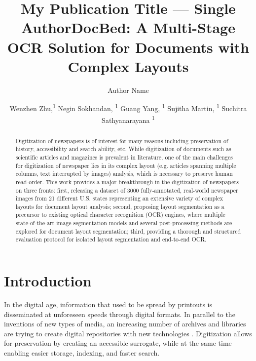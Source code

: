 \documentclass[letterpaper]{article} %
\title{My Publication Title --- Single Author}
\author {
    Author Name
}
\title{\title{DocBed: A Multi-Stage OCR Solution for Documents with Complex Layouts}}
\author {
    Wenzhen Zhu,\textsuperscript{\rm 1}
    Negin Sokhandan, \textsuperscript{\rm 1}
    Guang Yang, \textsuperscript{\rm 1}
    Sujitha Martin, \textsuperscript{\rm 1}
    Suchitra Sathyanarayana \textsuperscript{\rm 1}
}
\begin{document}
\maketitle

\begin{abstract}
Digitization of newspapers is of interest for many reasons including preservation of history, accessibility and search ability, etc. While digitization of documents such as scientific articles and magazines is prevalent in literature, one of the main challenges for digitization of newspaper lies in its complex layout (e.g. articles spanning multiple columns, text interrupted by images) analysis, which is necessary to preserve human read-order. This work provides a major breakthrough in the digitization of newspapers on three fronts: first, releasing a dataset of 3000 fully-annotated, real-world newspaper images from 21 different U.S. states representing an extensive variety of complex layouts for document layout analysis; second, proposing layout segmentation as a precursor to existing optical character recognition (OCR) engines, where multiple state-of-the-art image segmentation models and several post-processing methods are explored for document layout segmentation; third, providing a thorough and structured evaluation protocol for isolated layout segmentation and end-to-end OCR.

\end{abstract}

\section{Introduction}
In the digital age, information that used to be spread by printouts is disseminated at unforeseen speeds through digital formats. In parallel to the inventions of new types of media, an increasing number of archives and libraries are trying to create digital repositories with new technologies \cite{DBLP:journals/firstmonday/Cox07}. Digitization allows for preservation by creating an accessible surrogate, while at the same time enabling easier storage, indexing, and faster search.

\end{document}
